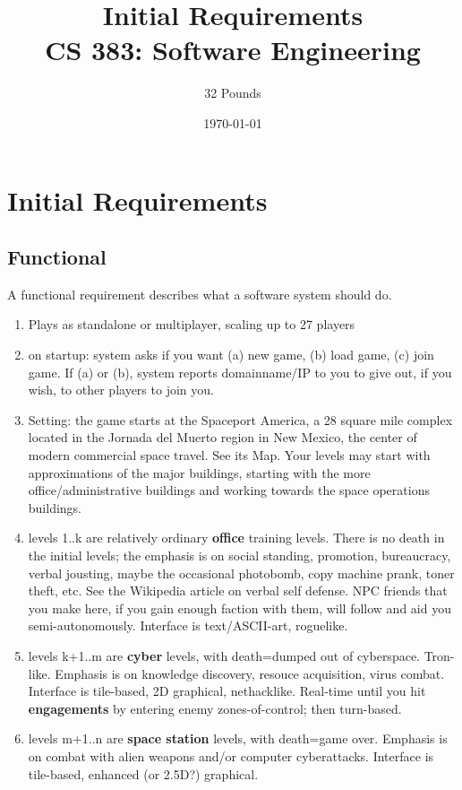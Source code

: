 \documentclass[12pt]{report}
\begin{document}
\title{Initial Requirements\\ \vspace{2 mm} {\large CS 383: Software Engineering}}

\author{32 Pounds}
\date{\today}
\maketitle
\clearpage

\chapter{Initial Requirements}
\section{Functional}
A functional requirement describes what a software system should do.

\begin{enumerate}
\item Plays as standalone or multiplayer, scaling up to 27 players
\item on startup: system asks if you want (a) new game, (b) load game, (c) join game. If (a) or (b), system reports domainname/IP to you to give out, if you wish, to other players to join you.
\item Setting: the game starts at the Spaceport America, a 28 square mile complex located in the Jornada del Muerto region in New Mexico, the center of modern commercial space travel. See its Map. Your levels may start with approximations of the major buildings, starting with the more office/administrative buildings and working towards the space operations buildings.
\item levels 1..k are relatively ordinary \textbf {office} training levels. There is no death in the initial levels; the emphasis is on social standing, promotion, bureaucracy, verbal jousting, maybe the occasional photobomb, copy machine prank, toner theft, etc. See the Wikipedia article on verbal self defense. NPC friends that you make here, if you gain enough faction with them, will follow and aid you semi-autonomously. Interface is text/ASCII-art, roguelike.
\item levels k+1..m are \textbf{cyber} levels, with death=dumped out of cyberspace. Tron-like. Emphasis is on knowledge discovery, resouce acquisition, virus combat. Interface is tile-based, 2D graphical, nethacklike. Real-time until you hit \textbf{engagements} by entering enemy zones-of-control; then turn-based.
\item levels m+1..n are \textbf{space station} levels, with death=game over. Emphasis is on combat with alien weapons and/or computer cyberattacks. Interface is tile-based, enhanced (or 2.5D?) graphical.
\end{enumerate}
\end{document}
